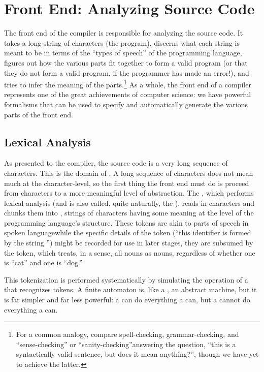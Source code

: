 \section{Front End: Analyzing Source Code}
The front end of the compiler is responsible for analyzing the source code. It takes a long string of characters (the program), discerns what each string is meant to be in terms of the ``types of speech'' of the programming language, figures out how the various parts fit together to form a valid program (or that they do not form a valid program, if the programmer has made an error!), and tries to infer the meaning of the parts.\footnote{For a common analogy, compare spell-checking, grammar-checking, and ``sense-checking'' or ``sanity-checking''\empause answering the question, ``this is a syntactically valid sentence, but does it mean anything?''\empause , though we have yet to achieve the latter.} As a whole, the front end of a compiler represents one of the great achievements of computer science: we have powerful formalisms that can be used to specify and automatically generate the various parts of the front end.

\subsection{Lexical Analysis}
As presented to the compiler, the source code is a very long sequence of characters. This is the domain of . A long sequence of characters does not mean much at the character-level, so the first thing the front end must do is proceed from characters to a more meaningful level of abstraction. The , which performs lexical analysis (and is also called, quite naturally, the ), reads in characters and chunks them into , strings of characters having some meaning at the level of the programming language's structure. These tokens are akin to parts of speech in spoken language\empause while the specific details of the token (``this identifier is formed by the string '') might be recorded for use in later stages, they are subsumed by the token, which treats, in a sense, all nouns as nouns, regardless of whether one is ``cat'' and one is ``dog.''

This tokenization is performed systematically by simulating the operation of a  that recognizes tokens. A finite automaton is, like a \TM, an abstract machine, but it is far simpler and far less powerful: a \TM can do everything a \FA can, but a \FA cannot do everything a \TM can.

